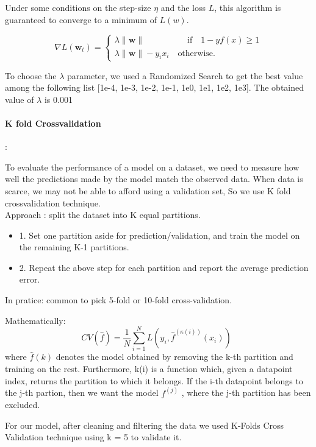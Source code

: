 \documentclass[11pt]{article}
\begin{document}
Under some conditions on the step-size $\eta$ and the loss $L$, this algorithm is guaranteed to converge to a minimum of $L(w)$.

$$\nabla L (\mathbf{w}_t)
=
\begin{cases}
\lambda \| \mathbf{w}\| \quad \quad \quad \quad\quad \text{if}\quad 1-yf(x) \geq 1 \\ \lambda \| \mathbf{w}\|-y_ix_i \quad\text{otherwise.}
\end{cases}
$$

To choose the $\lambda $ parameter, we used a Randomized Search to get the best value among the following list [1e-4, 1e-3, 1e-2, 1e-1, 1e0, 1e1, 1e2, 1e3]. The obtained value of $\lambda $ is 0.001

\paragraph{K fold Crossvalidation}: 

To evaluate the performance of a model on a dataset, we need to measure how well the predictions made by the model match the observed data. 
When data is scarce, we may not be able to afford using a validation set, So we use K fold crossvalidation technique.\\
Approach : split the dataset into K equal partitions.
\begin{itemize}
    \item 1. Set one partition aside for prediction/validation, and train the model on the remaining K-1 partitions.\\
   \item 2. Repeat the above step for each partition and report the average prediction error.

\end{itemize}

In pratice: common to pick 5-fold or 10-fold cross-validation.

Mathematically: 
$$
        CV({\hat{f}}) = \frac{1}{N} \sum_{i=1}^{N} L(y_{i}, {\hat{f}}^{(\kappa(i))}(x_{i})) \enspace $$
where $\hat{f}(k)$ denotes the model obtained by removing the k-th partition and training on the
rest. Furthermore, k(i) is a function which, given a datapoint index, returns the partition to
which it belongs. If the i-th datapoint belongs to the j-th partion, then we want the model
$f^{(j)}$
, where the j-th partition has been excluded.


For our model, after cleaning and filtering the data we used K-Folds Cross Validation technique using k = 5 to validate it.
\end{document}
